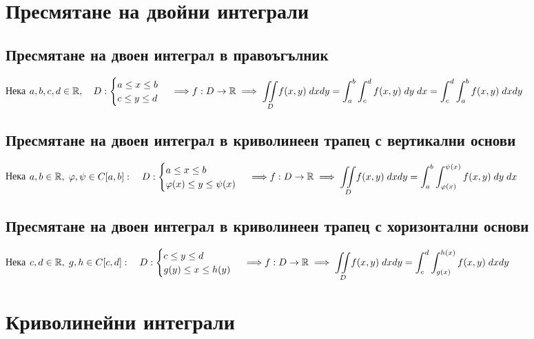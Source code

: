 \documentclass[14pt]{extarticle}
\newcommand{\R}{\mathbb{R}}
\newcommand{\Int}{\displaystyle\int}
\newcommand{\IInt}{\displaystyle\iint}
\begin{document}
\section*{Пресмятане на двойни интеграли}
\subsection*{Пресмятане на двоен интеграл в правоъгълник}
Нека \(a, b,c , d \in \R, \quad  D : \begin{cases}
    a \leq x \leq b \\
    c \leq y \leq d \\
\end{cases} \implies \\\\\\
f : D \to \R \implies \underset{D}{\IInt} f(x, y) \; dxdy = \Int_a^b\Int_c^d f(x, y) \; dy\; dx = \Int_c^d\Int_a^b f(x, y) \; dxdy\)
\subsection*{Пресмятане на двоен интеграл в криволинеен трапец с вертикални основи}
Нека \(a, b \in \R, \; \varphi, \psi \in C[a, b] : \quad  D : \begin{cases}
    a \leq x \leq b \\
    \varphi(x) \leq y \leq \psi(x) \\
\end{cases} \implies \\\\\\
f : D \to \R \implies \underset{D}{\IInt} f(x, y) \; dxdy = \Int_a^b\Int_{\varphi(x)}^{\psi(x)} f(x, y) \; dy\; dx\)
\subsection*{Пресмятане на двоен интеграл в криволинеен трапец с хоризонтални основи}
Нека \(c, d \in \R, \; g, h \in C[c, d] : \quad  D : \begin{cases}
    c \leq y \leq d \\
    g(y) \leq x \leq h(y) \\
\end{cases} \implies \\\\\\
f : D \to \R \implies \underset{D}{\IInt} f(x, y) \; dxdy = \Int_c^d\Int_{g(x)}^{h(x)} f(x, y) \; dxdy\)
\section*{Криволинейни интеграли}
\end{document}
